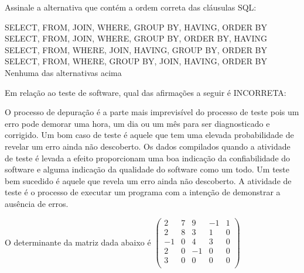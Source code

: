 \documentclass[12pt, addpoints]{exam}
\begin{document}
    \begin{questions}

    \newpage
    \question
Assinale a alternativa que contém a ordem correta das cláusulas SQL:

\begin{choices}
\choice SELECT, FROM, JOIN, WHERE, GROUP BY, HAVING, ORDER BY
\choice SELECT, FROM, JOIN, WHERE, GROUP BY, ORDER BY, HAVING
\choice SELECT, FROM, WHERE, JOIN, HAVING, GROUP BY, ORDER BY
\choice SELECT, FROM, WHERE, GROUP BY, JOIN, HAVING, ORDER BY
\choice Nenhuma das alternativas acima
\end{choices}

\question
Em relação ao teste de software, qual das afirmações a seguir é INCORRETA: 
\begin{choices}
\choice O processo de depuração é a parte mais imprevisível do processo de teste pois um erro pode demorar uma hora, um dia ou um mês para ser diagnosticado e corrigido. 
\choice Um bom caso de teste é aquele que tem uma elevada probabilidade de revelar um erro ainda não descoberto. 
\choice Os dados compilados quando a atividade de teste é levada a efeito proporcionam uma boa indicação da confiabilidade do software e alguma indicação da qualidade do software como um todo. 
\choice Um teste bem sucedido é aquele que revela um erro ainda não descoberto. 
\choice A atividade de teste é o processo de executar um programa com a intenção de demonstrar a ausência de erros. 
\end{choices}

\question
O determinante da matriz dada abaixo é
$\begin{pmatrix}
2 & 7 & 9 & -1 & 1 \\
2 & 8 & 3 & 1 & 0 \\
-1 & 0 & 4 & 3 & 0 \\
2 & 0 & -1 & 0 & 0 \\
3 & 0 & 0 & 0 & 0 \\
\end{pmatrix}$
\begin{choices}
\end{choices}


\end{questions}
\end{document}
